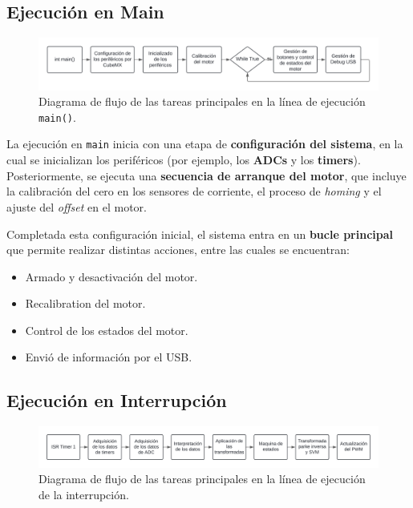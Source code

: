 \documentclass[11pt]{report}
\begin{document}
\subsection{Ejecución en Main}

\begin{figure}[ht]
	\centering
	\includegraphics[width=\textwidth]{imagenes/Diagramas/linea main.png}
	\caption{Diagrama de flujo de las tareas principales en la línea de ejecución \texttt{main()}.}
	\label{fig:linea_ejecucion_main}
\end{figure}
\FloatBarrier

La ejecución en \texttt{main} inicia con una etapa de \textbf{configuración del sistema}, en la cual se inicializan los periféricos (por ejemplo, los \textbf{ADCs} y los \textbf{timers}). Posteriormente, se ejecuta una \textbf{secuencia de arranque del motor}, que incluye la calibración del cero en los sensores de corriente, el proceso de \emph{homing} y el ajuste del \emph{offset} en el motor.

\newpage
Completada esta configuración inicial, el sistema entra en un \textbf{bucle principal} que permite realizar distintas acciones, entre las cuales se encuentran:
\begin{itemize}
	\item Armado y desactivación del motor.
	\item Recalibration del motor.
	\item Control de los estados del motor.
	\item Envió de información por el USB.
\end{itemize}

\subsection{Ejecución en Interrupción}

\begin{figure}[ht]
	\centering
	\includegraphics[width=\textwidth]{imagenes/Diagramas/linea timer.png}
	\caption{Diagrama de flujo de las tareas principales en la línea de ejecución de la interrupción.}
	\label{fig:linea_ejecucion_interrupcion}
\end{figure}
\FloatBarrier
\end{document}
